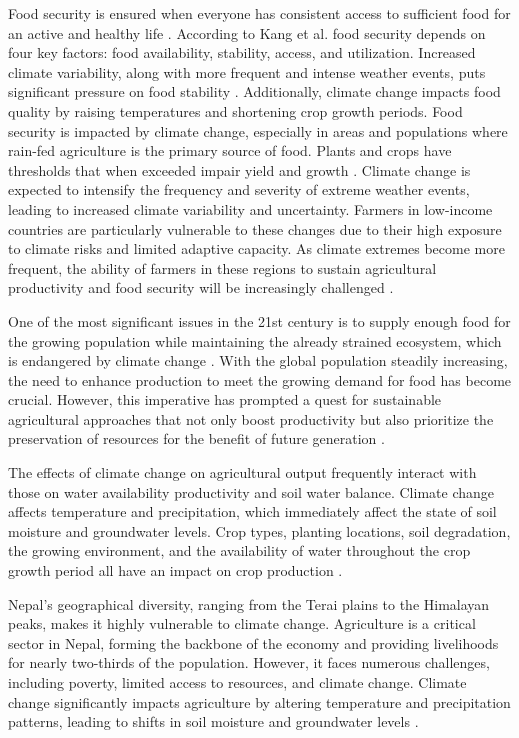 Food security is ensured when everyone has consistent access to sufficient food for an active and healthy life \citep{mulunehImpactClimateChange2021}. According to Kang et al.  food security depends on four key factors: food availability, stability, access, and utilization. Increased climate variability, along with more frequent and intense weather events, puts significant pressure on food stability \citep{kangClimateChangeImpacts2009}. Additionally, climate change impacts food quality by raising temperatures and shortening crop growth periods. Food security is impacted by climate change, especially in areas and populations where rain-fed agriculture is the primary source of food. Plants and crops have thresholds that when exceeded impair yield and growth \citep{mulunehImpactClimateChange2021}. Climate change is expected to intensify the frequency and severity of extreme weather events, leading to increased climate variability and uncertainty. Farmers in low-income countries are particularly vulnerable to these changes due to their high exposure to climate risks and limited adaptive capacity.  As climate extremes become more frequent, the ability of farmers in these regions to sustain agricultural productivity and food security will be increasingly challenged \citep{budhathokiAssessingFarmersPreparedness2020}. 

One of the most significant issues in the 21st century is to supply enough food for the growing population while maintaining the already strained ecosystem, which is endangered by climate change \citep{kangClimateChangeImpacts2009}. With the global population steadily increasing, the need to enhance production to meet the growing demand for food has become crucial. However, this imperative has prompted a quest for sustainable agricultural approaches that not only boost productivity but also prioritize the preservation of resources for the benefit of future generation \citep{singhSocioeconomicStatusQualitative2022}. 

The effects of climate change on agricultural output frequently interact with those on water availability productivity and soil water balance. Climate change affects temperature and precipitation, which immediately affect the state of soil moisture and groundwater levels. Crop types, planting locations, soil degradation, the growing environment, and the availability of water throughout the crop growth period all have an impact on crop production \citep{risalImpactClimateChange2022}.

Nepal's geographical diversity, ranging from the Terai plains to the Himalayan peaks, makes it highly vulnerable to climate change. Agriculture is a critical sector in Nepal, forming the backbone of the economy and providing livelihoods for nearly two-thirds of the population. However, it faces numerous challenges, including poverty, limited access to resources, and climate change. Climate change significantly impacts agriculture by altering temperature and precipitation patterns, leading to shifts in soil moisture and groundwater levels \citep{gyawaliOverviewAgricultureNepal2021}.

